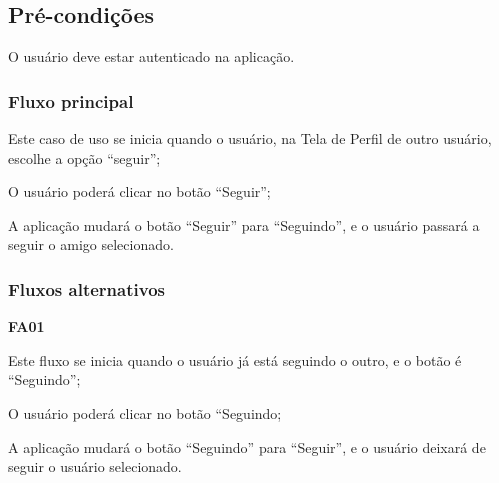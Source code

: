 \subsection*{Pré-condições}
O usuário deve estar autenticado na aplicação. 

\subsubsection*{Fluxo principal}
\begin{lista}
	\item Este caso de uso se inicia quando o usuário, na Tela de Perfil de outro usuário, escolhe a opção “seguir”;
	\item O usuário poderá clicar no botão “Seguir”;
	\item A aplicação mudará o botão “Seguir” para “Seguindo”, e o usuário passará a seguir o amigo selecionado.
\end{lista}

\subsubsection*{Fluxos alternativos}
\begin{lista}
	\item \textbf{FA01}
	\begin{lista}
		\item  Este fluxo se inicia quando o usuário já está seguindo o outro, e o botão é “Seguindo”;
		\item  O usuário poderá clicar no botão “Seguindo;
		\item  A aplicação mudará o botão “Seguindo” para “Seguir”, e o usuário deixará de seguir o usuário selecionado.
	\end{lista}
\end{lista}
\pagebreak